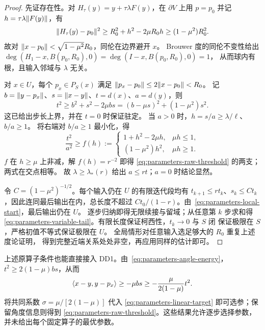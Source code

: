 \begin{proof}
先证存在性。对 $H_\tau(y)=y+\tau\lambda F(y)$，在 $\partial V$ 上用 $p=p_0$
并记 $h=\tau\lambda\lVert F(y)\rVert$，有
\[
 \lVert H_\tau(y)-p_0\rVert^2\ge R_0^2+h^2-2\mu R_0h
 \ge(1-\mu^2)R_0^2.
\]
故对 $\lVert x-p_0\rVert<\sqrt{1-\mu^2}R_0$，同伦在边界避开 $x$。
Brouwer 度的同伦不变性给出
$\deg(H_1-x,B(p_0,R_0),0)=\deg(I-x,B(p_0,R_0),0)=1$，
从而球内有根，且输入邻域与 $\lambda$ 无关。

对 $x\in U$，每个 $p_x\in P_S(x)$ 满足
$\lVert p_x-p_0\rVert\le2\lVert x-p_0\rVert<R_0$。
记 $b=\lVert y-p_x\rVert$、$s=\lVert x-y\rVert$、$t=d(x)$、$a=d(y)$，则
\begin{equation}\label{eq:parameters-angle-energy}
 t^2\ge b^2+s^2-2\mu bs
 =(b-\mu s)^2+(1-\mu^2)s^2.
\end{equation}
这已给出步长上界，并在 $t=0$ 时保证驻定。
当 $a>0$ 时，$h=s/a\ge\lambda/\ell$、$b/a\ge1$。
将右端对 $b/a\ge1$ 最小化，得
\[
 \frac{t^2}{a^2}\ge f(h):=
 \begin{cases}1+h^2-2\mu h,&\mu h\le1,\\
 (1-\mu^2)h^2,&\mu h\ge1.\end{cases}
\]
$f$ 在 $h\ge\mu$ 上非减，解 $f(h)=r^{-2}$ 即得
\eqref{eq:parameters-raw-threshold} 的两支；两式在交点相等。
故 $\lambda\ge\lambda_*(r)$ 给出 $a\le rt$；$a=0$ 时结论显然。

令 $C=(1-\mu^2)^{-1/2}$。每个输入仍在 $U$ 的有限迭代段均有
$t_{k+1}\le rt_k$、$s_k\le Ct_k$，因此连同最后输出在内，总长度不超过
$Ct_0/(1-r)$。由~\eqref{eq:parameters-local-start}，最后输出仍在 $U$。
逐步归纳即得无限续接与留域；从任意第 $k$ 步求和得
\eqref{eq:parameters-variable-tail}。有限长度保证柯西性，$t_k\to0$ 与 $S$ 闭
保证极限在 $S$，严格初值不等式保证极限在 $U$。
全局情形对任意输入选足够大的 $R_0$ 重复上述度论证明，
得到完整近端关系处处非空，再应用同样的估计即可。
\end{proof}

上述原算子条件也能直接接入 DD1。由~\eqref{eq:parameters-angle-energy}，
$t^2\ge2(1-\mu)bs$，从而
\[
 \langle x-y,y-p_x\rangle\ge-\mu bs
 \ge-\frac{\mu}{2(1-\mu)}t^2.
\]
将共同系数 $\sigma=\mu/[2(1-\mu)]$ 代入
\eqref{eq:parameters-linear-target} 即可选参；保留角度信息则得到
\eqref{eq:parameters-raw-threshold}。这些结果允许逐步选择参数，
并未给出每个固定算子的最优参数。
